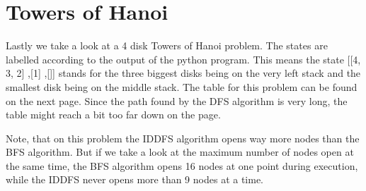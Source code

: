 \section{Towers of Hanoi}

Lastly we take a look at a 4 disk Towers of Hanoi problem.
The states are labelled according to the output of the python program.
This means the state [[4, 3, 2] ,[1] ,[]] stands for the three biggest disks being on the very left stack and the smallest disk being on the middle stack.
The table for this problem can be found on the next page.
Since the path found by the DFS algorithm is very long, the table might reach a bit too far down on the page.

Note, that on this problem the IDDFS algorithm opens way more nodes than the BFS algorithm.
But if we take a look at the maximum number of nodes open at the same time, the BFS algorithm opens 16 nodes at one point during execution, while the IDDFS never opens more than 9 nodes at a time.

